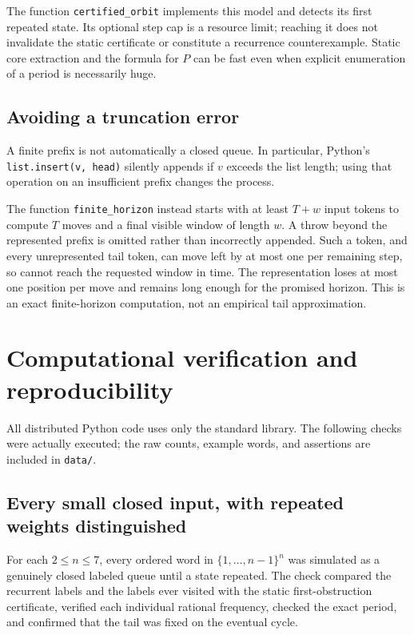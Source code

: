 \documentclass[11pt,letterpaper]{article}
\theoremstyle{definition}
\begin{document}
The function \texttt{certified\_orbit} implements this model and detects its
first repeated state. Its optional step cap is a resource limit; reaching
it does not invalidate the static certificate or constitute a recurrence
counterexample. Static core extraction and the formula for $P$ can be fast
even when explicit enumeration of a period is necessarily huge.

\subsection{Avoiding a truncation error}
A finite prefix is not automatically a closed queue. In particular, Python's
\texttt{list.insert(v, head)} silently appends if $v$ exceeds the list length;
using that operation on an insufficient prefix changes the process.

The function \texttt{finite\_horizon} instead starts with at least $T+w$
input tokens to compute $T$ moves and a final visible window of length $w$.
A throw beyond the represented prefix is omitted rather than incorrectly
appended. Such a token, and every unrepresented tail token, can move left by
at most one per remaining step, so cannot reach the requested window in time.
The representation loses at most one position per move and remains long
enough for the promised horizon. This is an exact finite-horizon computation,
not an empirical tail approximation.

\section{Computational verification and reproducibility}\label{sec:verification}
All distributed Python code uses only the standard library. The following
checks were actually executed; the raw counts, example words, and assertions
are included in \texttt{data/}.

\subsection{Every small closed input, with repeated weights distinguished}
For each $2\le n\le7$, every ordered word in $\{1,\ldots,n-1\}^n$ was
simulated as a genuinely closed labeled queue until a state repeated. The
check compared the recurrent labels and the labels ever visited with the
static first-obstruction certificate, verified each individual rational
frequency, checked the exact period, and confirmed that the tail was fixed
on the eventual cycle.
\end{document}
